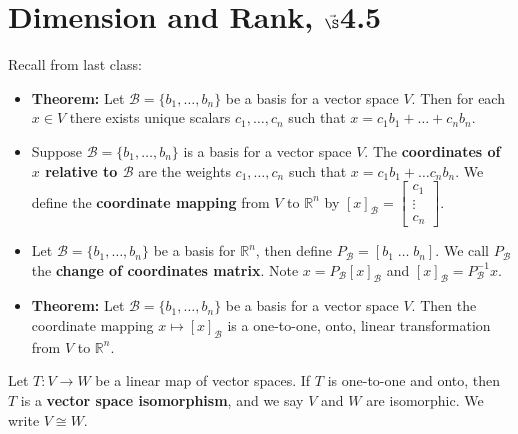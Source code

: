 


%
%
%

\section{{Dimension and Rank, $\vec\S$4.5}}%
% 

%
\thispagestyle{fancy}

Recall from last class:

\begin{itemize}
\item {\bf Theorem:} Let $\mathcal{B} =\{b_1, \dots, b_n\}$ be a basis for a  vector space $V$. Then for each $x \in V$ there exists unique scalars $c_1,\dots, c_n$ such that $x=c_1 b_1+\dots+ c_n b_n$.
\item Suppose $\mathcal{B}=\{b_1, \dots, b_n\}$ is a basis for a vector space $V$. The {\bf coordinates of $x$ relative to $\mathcal{B}$} are the weights $c_1, \dots, c_n$ such that $x=c_1 b_1 +\dots c_n b_n$. We define the {\bf coordinate mapping} from $V$ to $\mathbb{R}^n$ by $[x]_\mathcal{B}=\begin{bmatrix} c_1\\ \vdots\\ c_n \end{bmatrix}$.
\item Let $\mathcal{B}=\{b_1, \dots, b_n\}$ be a basis for $\mathbb{R}^n$, then define $P_\mathcal{B}=[b_1 \; \dots \; b_n]$. We call $P_\mathcal{B}$ the {\bf change of coordinates matrix}. Note $x = P_\mathcal{B} [x]_{\mathcal{B}}$ and $[x]_\mathcal{B}=P_{\mathcal{B}}^{-1} x.$
\item {\bf Theorem:} Let $\mathcal{B}=\{ b_1, \dots, b_n\}$ be a basis for a vector space $V$. Then the coordinate mapping $x \mapsto [x]_\mathcal{B}$ is a one-to-one, onto, linear transformation from $V$ to $\mathbb{R}^n$.
\end{itemize}

\newpage

\begin{defn}
	Let $T: V \to W$ be a linear map of vector spaces. If $T$ is one-to-one and onto, then $T$ is a {\bf vector space isomorphism}, and we say $V$ and $W$ are isomorphic. We write $V \cong W$.
\end{defn}


